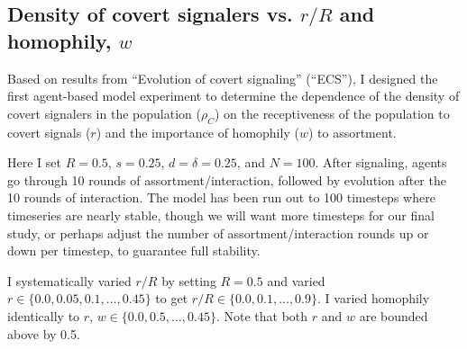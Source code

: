 \documentclass[11pt,letterpaper]{article}
\begin{document}
\subsection{Density of covert signalers vs. $r/R$ and homophily, $w$}

Based on results from ``Evolution of covert signaling'' (``ECS''), I designed
the first agent-based model experiment to determine the dependence of the
density of covert signalers in the population ($\rho_C$) on
the receptiveness of the population to covert signals ($r$) and the
importance of homophily ($w$) to assortment. 

Here I set $R=0.5$, $s=0.25$, $d=\delta=0.25$,
and $N=100$. After signaling, agents go through 10 rounds of assortment/interaction,
followed by evolution after the 10 rounds of interaction. The model has been
run out to 100 timesteps where timeseries are nearly stable, though we will
want more timesteps for our final study, or perhaps adjust the number of 
assortment/interaction rounds up or down per timestep, to guarantee full 
stability.

I systematically varied $r/R$ by setting $R=0.5$ and varied 
$r \in \{0.0, 0.05, 0.1, \ldots, 0.45\}$ to get $r/R \in \{0.0, 0.1, \ldots, 0.9\}$.
I varied homophily identically to $r$, $w \in \{0.0, 0.5, \ldots, 0.45\}$. Note
that both $r$ and $w$ are bounded above by 0.5.
\end{document}
